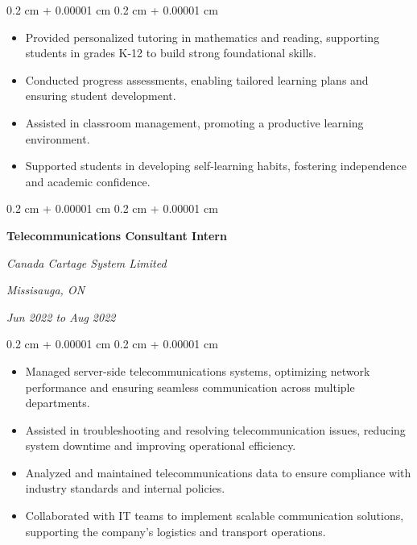 \documentclass[10pt, letterpaper]{article}
\newenvironment{highlights}{
    \begin{itemize}[
        topsep=0.10 cm,
        parsep=0.10 cm,
        partopsep=0pt,
        itemsep=0pt,
        leftmargin=0.4 cm + 10pt
    ]
}{
    \end{itemize}
} %
\newenvironment{onecolentry}{
    \begin{adjustwidth}{
        0.2 cm + 0.00001 cm
    }{
        0.2 cm + 0.00001 cm
    }
}{
    \end{adjustwidth}
} %
\newenvironment{twocolentry}[2][]{
    \onecolentry
    \def\secondColumn{#2}
    \setcolumnwidth{\fill, 4.5 cm}
    \begin{paracol}{2}
}{
    \switchcolumn \raggedleft \secondColumn
    \end{paracol}
    \endonecolentry
} %
\begin{document}
        \vspace{0.10 cm}
        \begin{onecolentry}
            \begin{highlights}
                \item Provided personalized tutoring in mathematics and reading, supporting students in grades K-12 to build strong foundational skills.
                \item Conducted progress assessments, enabling tailored learning plans and ensuring student development.
                \item Assisted in classroom management, promoting a productive learning environment.
                \item Supported students in developing self-learning habits, fostering independence and academic confidence.
            \end{highlights}
        \end{onecolentry}


        \vspace{0.2 cm}

        \begin{twocolentry}{
        \textit{Missisauga, ON}    
            
        \textit{Jun 2022 to Aug 2022}}
            \textbf{Telecommunications Consultant Intern}
            
            \textit{Canada Cartage System Limited}
        \end{twocolentry}

        \vspace{0.10 cm}
        \begin{onecolentry}
            \begin{highlights}
                \item Managed server-side telecommunications systems, optimizing network performance and ensuring seamless communication across multiple departments.
                \item Assisted in troubleshooting and resolving telecommunication issues, reducing system downtime and improving operational efficiency.
                \item Analyzed and maintained telecommunications data to ensure compliance with industry standards and internal policies.
                \item Collaborated with IT teams to implement scalable communication solutions, supporting the company's logistics and transport operations.
            \end{highlights}
        \end{onecolentry}
\end{document}
